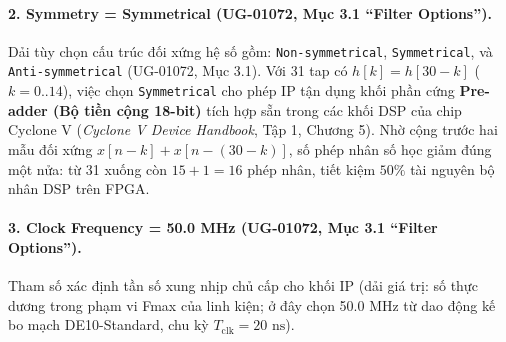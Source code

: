 \paragraph{2. Symmetry = Symmetrical (UG-01072, Mục 3.1 ``Filter Options'').}
Dải tùy chọn cấu trúc đối xứng hệ số gồm: \texttt{Non-symmetrical}, \texttt{Symmetrical}, và \texttt{Anti-symmetrical} (UG-01072, Mục 3.1). Với 31 tap có $h[k] = h[30 - k]$ ($k = 0..14$), việc chọn \texttt{Symmetrical} cho phép IP tận dụng khối phần cứng \textbf{Pre-adder (Bộ tiền cộng 18-bit)} tích hợp sẵn trong các khối DSP của chip Cyclone V (\emph{Cyclone V Device Handbook}, Tập 1, Chương 5).
Nhờ cộng trước hai mẫu đối xứng $x[n-k] + x[n-(30-k)]$, số phép nhân số học giảm đúng một nửa: từ 31 xuống còn $15 + 1 = 16$ phép nhân, tiết kiệm $50\%$ tài nguyên bộ nhân DSP trên FPGA.

\paragraph{3. Clock Frequency = 50.0 MHz (UG-01072, Mục 3.1 ``Filter Options'').}
Tham số xác định tần số xung nhịp chủ cấp cho khối IP (dải giá trị: số thực dương trong phạm vi Fmax của linh kiện; ở đây chọn 50.0 MHz từ dao động kế bo mạch DE10-Standard, chu kỳ $T_{\text{clk}} = 20\text{ ns}$).

